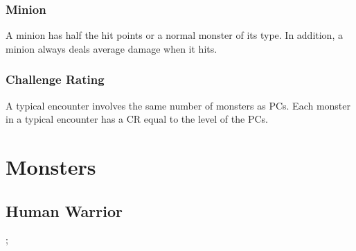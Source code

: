 \subsubsection{Minion}
A minion has half the hit points or a normal monster of its type. In addition, a minion always deals average damage when it hits.

\subsubsection{Challenge Rating}

A typical encounter involves the same number of monsters as PCs. Each monster in a typical encounter has a CR equal to the level of the PCs.

\section{Monsters}

\begin{comment}

\subsection{Example}
\montypes{Align}{Size}{type}{CR}{Archetypes}
\monsenses{Init}{\plus Perception}
\monspace{Space}{Reach}; \monspeed{Speed ft.}%
\monlanguages{Languages}

\monlinerule 

\monac{Normal}{Touch}{Flat}{CMD}{modifiers}
\monhp{HP}{HV}
\monsaves{Fort}{Ref}{Will}

\monlinerule

\monmelee{Melee}
\moncmb{BAB}{CMB}

\monlinerule 

\monattributes{}{}{}{}{}{}
\monfeats{Feats}
\monskills{Skills}

\monlinerule

\monability{Name}{Effect}

\mondescription{Monster Name}

\monbehavior{Monster Name}

\end{comment}

\subsection{Human Warrior}
; %

